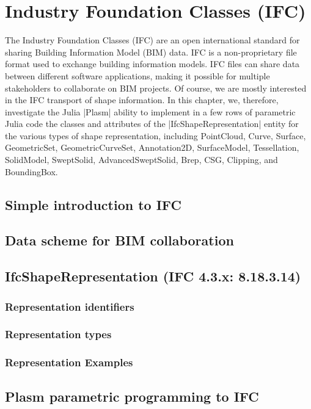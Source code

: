 

\chapter{Industry Foundation Classes (IFC)}
\label{chapt:10}

The Industry Foundation Classes (IFC) are an open international standard for sharing Building Information Model (BIM) data.
IFC is a non-proprietary file format used to exchange building information models. IFC files can share data between different software applications, making it possible for multiple stakeholders to collaborate on BIM projects. Of course, we are mostly interested in the IFC transport of shape information.
In this chapter, we, therefore, investigate the Julia |Plasm| ability to implement in a few rows of parametric Julia code the classes and attributes of the |IfcShapeRepresentation|
entity for the various types of shape representation, including PointCloud, Curve, Surface, GeometricSet, GeometricCurveSet, Annotation2D, SurfaceModel, Tessellation, SolidModel, SweptSolid, AdvancedSweptSolid, Brep, CSG, Clipping, and BoundingBox. 

\section{Simple introduction to IFC}\label{sect:10-1}


\section{Data scheme for BIM collaboration}\label{sect:10-2}


\section{IfcShapeRepresentation (IFC 4.3.x: 8.18.3.14)}\label{sect:10-3}

\subsection{Representation identifiers}\label{sect:10-3-1}


\subsection{Representation types}\label{sect:10-3-2}


\subsection{Representation Examples}\label{sect:10-3-3}




\section{Plasm parametric programming to IFC}\label{sect:10-4}


